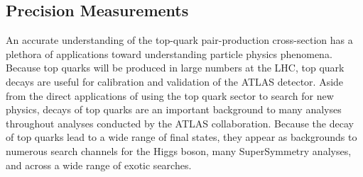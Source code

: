 \subsection{Precision Measurements}
An accurate understanding of the top-quark pair-production cross-section has a plethora of applications toward understanding particle physics phenomena.
Because top quarks will be produced in large numbers at the LHC, top quark decays are useful for
calibration and validation of the ATLAS detector.
Aside from the direct applications of using the top quark sector to search for new physics,
decays of top quarks are an important background to many analyses throughout analyses conducted by the ATLAS collaboration.
Because the decay of top quarks lead to a wide range of final states, they appear as backgrounds to
numerous search channels for the Higgs boson, many SuperSymmetry analyses, and across a wide range of exotic searches.







